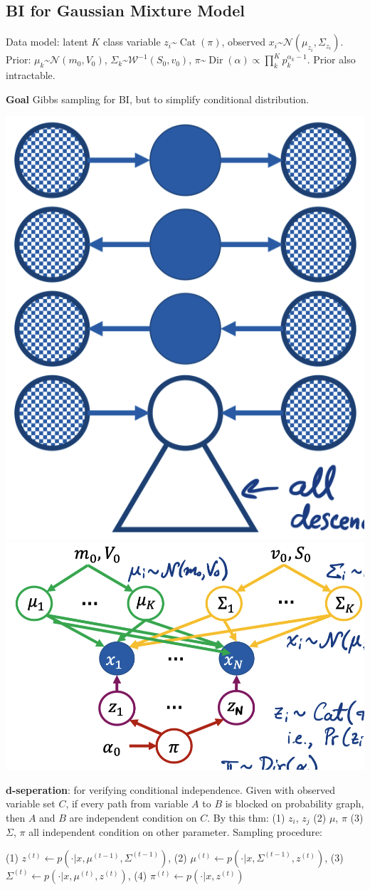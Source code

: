 \subsection*{BI for Gaussian Mixture Model}
Data model: latent $K$ class variable $z_i $\textasciitilde$ \operatorname{Cat}(\pi)$, observed $x_i$\textasciitilde$ \mathcal{N}(\mu_{z_i}, \Sigma_{z_i})$. Prior: $\mu_k $\textasciitilde$ \mathcal{N}(m_0,V_0)$, $\Sigma_k $\textasciitilde$ \mathcal{W}^{-1}(S_0, v_0)$, $\pi$\textasciitilde$ \operatorname{Dir}(\alpha)\propto\prod_k^{K} p_{k}^{\alpha_k-1}$. Prior also intractable. 

\textbf{Goal} Gibbs sampling for BI, but to simplify conditional distribution.
\vspace{-0.3cm}
\begin{center}
    \includegraphics[width=0.25\columnwidth]{figures/d-sep.png}
    \includegraphics[width=0.4\columnwidth]{figures/GMM.png}
\end{center}
\vspace{-0.4cm}

\textbf{d-seperation}: for verifying conditional independence. Given with observed variable set $C$, if every path from variable $A$ to $B$ is blocked on probability graph, then $A$ and $B$ are independent condition on $C$. By this thm: (1) $z_i$, $z_j$ (2) $\mu$, $\pi$  (3) $\Sigma$, $\pi$ all independent condition on other parameter. Sampling procedure: \begin{scriptsize}
    (1) $z^{(t)} \leftarrow p\left(\cdot | x, \mu^{(t-1)}, \Sigma^{(t-1)}\right)$, (2) $\mu^{(t)} \leftarrow p\left(\cdot | x, \Sigma^{(t-1)}, z^{(t)}\right)$, (3) $\Sigma^{(t)} \leftarrow p\left(\cdot | x, \mu^{(t)}, z^{(t)}\right)$, (4) $\pi^{(t)} \leftarrow p\left(\cdot | x, z^{(t)}\right)$
\end{scriptsize}

